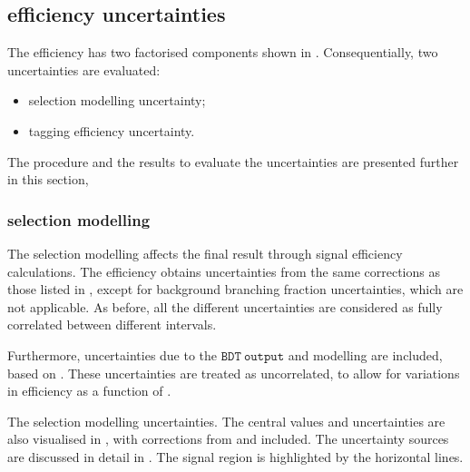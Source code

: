 \subsection{\texorpdfstring{\BtoXsgamma}{B->Xs gamma} efficiency uncertainties}\label{sec:signal_selection_uncertainties}

The \BtoXsgamma efficiency has two factorised components shown in .
Consequentially, two uncertainties are evaluated:
\begin{itemize}
    \item \BtoXsgamma selection modelling uncertainty;
    \item \BtoXsgamma tagging efficiency uncertainty.
\end{itemize}

The procedure and the results to evaluate the uncertainties are presented further in this section,

\subsubsection{\texorpdfstring{\BtoXsgamma}{B->Xs gamma} selection modelling}

The \BtoXsgamma selection modelling affects the final result through signal efficiency calculations.
The efficiency obtains uncertainties from the same corrections as those listed in , 
except for background branching fraction uncertainties, which are not applicable.
As before, all the different uncertainties are considered as fully correlated between different \EB intervals.

Furthermore, uncertainties due to the $\mathtt{BDT~output}$ and \ZMVA modelling are included, based on .
These uncertainties are treated as uncorrelated, to allow for variations in efficiency as a function of \EB.

\begin{table}[htbp!]
    \centering
    \caption{\label{tab:signal_selection_uncertainties}
    The \BtoXsgamma selection modelling uncertainties.
    The central values and uncertainties are also visualised in ,
    with corrections from  and  included.
    The uncertainty sources are discussed in detail in .
    The signal region is highlighted by the horizontal lines.
    }
    
\end{table}

